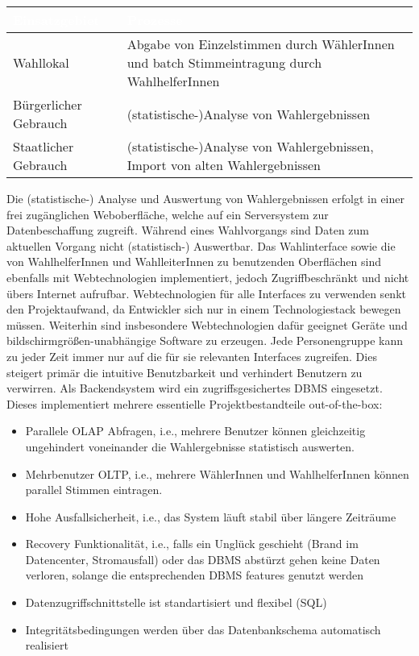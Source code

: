 \documentclass[a4paper,12pt]{article}
\begin{document}
\begin{center}
\begin{tabular}{|m{5cm}|m{10cm}|}
	\hline
  \rowcolor{TUMBlue} \textcolor{white}{\textbf{Einsatzgebiet}} & \textcolor{white}{\textbf{Prozesse}} \\
  \hline
  Wahllokal & Abgabe von Einzelstimmen durch WählerInnen und batch Stimmeintragung durch WahlhelferInnen \\
	\hline
  Bürgerlicher Gebrauch & (statistische-)Analyse von Wahlergebnissen \\
  \hline
  Staatlicher Gebrauch & (statistische-)Analyse von Wahlergebnissen, Import von alten Wahlergebnissen \\
	\hline
\end{tabular}
\end{center}

Die (statistische-) Analyse und Auswertung von Wahlergebnissen erfolgt in einer frei zugänglichen
Weboberfläche, welche auf ein Serversystem zur Datenbeschaffung zugreift. 
Während eines Wahlvorgangs sind Daten zum aktuellen Vorgang nicht (statistisch-) Auswertbar.
%
Das Wahlinterface sowie die von WahlhelferInnen und WahlleiterInnen zu benutzenden Oberflächen sind 
ebenfalls mit Webtechnologien implementiert, jedoch Zugriffbeschränkt und nicht übers Internet aufrufbar.
%
Webtechnologien für alle Interfaces zu verwenden senkt den Projektaufwand, da Entwickler sich nur in 
einem Technologiestack bewegen müssen. Weiterhin sind insbesondere Webtechnologien dafür geeignet
Geräte und bildschirmgrößen-unabhängige Software zu erzeugen.
%
Jede Personengruppe kann zu jeder Zeit immer nur auf die für sie relevanten Interfaces zugreifen.
Dies steigert primär die intuitive Benutzbarkeit und verhindert Benutzern zu verwirren. 
%
Als Backendsystem wird ein zugriffsgesichertes DBMS eingesetzt. Dieses implementiert mehrere 
essentielle Projektbestandteile out-of-the-box:

\begin{itemize}
      \item Parallele OLAP Abfragen, i.e., mehrere Benutzer können gleichzeitig ungehindert voneinander 
            die Wahlergebnisse statistisch auswerten.
      \item Mehrbenutzer OLTP, i.e., mehrere WählerInnen und WahlhelferInnen können parallel Stimmen
            eintragen.
      \item Hohe Ausfallsicherheit, i.e., das System läuft stabil über längere Zeiträume
      \item Recovery Funktionalität, i.e., falls ein Unglück geschieht (Brand im Datencenter, Stromausfall) 
            oder das DBMS abstürzt gehen keine Daten verloren, solange die entsprechenden DBMS features 
            genutzt werden
      \item Datenzugriffschnittstelle ist standartisiert und flexibel (SQL)
      \item Integritätsbedingungen werden über das Datenbankschema automatisch realisiert
\end{itemize}
\end{document}
